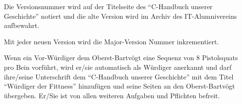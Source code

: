 \documentclass[fontsize=12pt,parskip=half]{scrartcl}
\begin{document}
\begin{contract}
  Die Versionsnummer wird auf der Titelseite des ``C-Handbuch unserer Geschichte'' notiert und die alte Version wird im Archiv des IT-Alumnivereins aufbewahrt.

  Mit jeder neuen Version wird die Major-Version Nummer inkrementiert.

  \Clause[title={Fittnessklausel}]
  Wenn ein Vor-Würdiger dem Oberst-Bartvögt eine Sequenz von 8 Pistolsquats pro Bein vorführt, wird er/sie automatisch als Würdiger anerkannt und darf ihre/seine Unterschrift
  dem ``C-Handbuch unserer Geschichte'' mit dem Titel ``Würdiger der Fittness'' hinzufügen und seine Seiten an den Oberst-Bartvögt übergeben. Er/Sie ist von allen weiteren
  Aufgaben und Pflichten befreit.

\end{contract}

\pagebreak
\end{document}
